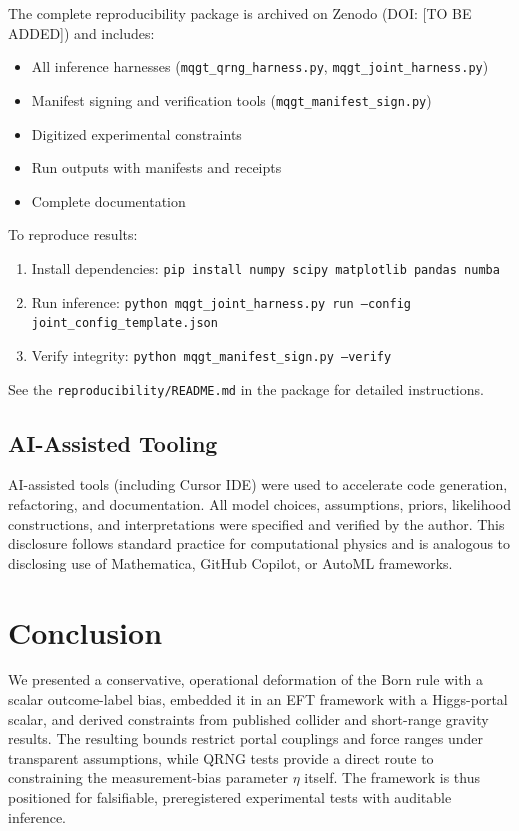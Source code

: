 \documentclass[11pt]{article}
\begin{document}
The complete reproducibility package is archived on Zenodo (DOI: [TO BE ADDED]) and includes:
\begin{itemize}
    \item All inference harnesses (\texttt{mqgt\_qrng\_harness.py}, \texttt{mqgt\_joint\_harness.py})
    \item Manifest signing and verification tools (\texttt{mqgt\_manifest\_sign.py})
    \item Digitized experimental constraints
    \item Run outputs with manifests and receipts
    \item Complete documentation
\end{itemize}

To reproduce results:
\begin{enumerate}
    \item Install dependencies: \texttt{pip install numpy scipy matplotlib pandas numba}
    \item Run inference: \texttt{python mqgt\_joint\_harness.py run --config joint\_config\_template.json}
    \item Verify integrity: \texttt{python mqgt\_manifest\_sign.py --verify}
\end{enumerate}

See the \texttt{reproducibility/README.md} in the package for detailed instructions.

\subsection{AI-Assisted Tooling}

AI-assisted tools (including Cursor IDE) were used to accelerate code generation, refactoring, and documentation. All model choices, assumptions, priors, likelihood constructions, and interpretations were specified and verified by the author. This disclosure follows standard practice for computational physics and is analogous to disclosing use of Mathematica, GitHub Copilot, or AutoML frameworks.

\section{Conclusion}
We presented a conservative, operational deformation of the Born rule with a scalar outcome-label bias, embedded it in an EFT framework with a Higgs-portal scalar, and derived constraints from published collider and short-range gravity results. The resulting bounds restrict portal couplings and force ranges under transparent assumptions, while QRNG tests provide a direct route to constraining the measurement-bias parameter $\eta$ itself. The framework is thus positioned for falsifiable, preregistered experimental tests with auditable inference.



\end{document}
